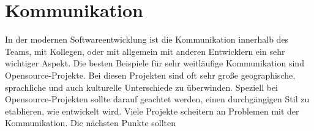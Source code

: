 \section{Kommunikation}
\SuperPar In der modernen Softwareentwicklung ist die Kommunikation innerhalb des Teams, mit Kollegen, oder mit allgemein mit anderen Entwicklern ein sehr wichtiger Aspekt. Die besten Beispiele für sehr weitläufige Kommunikation sind Opensource-Projekte. Bei diesen Projekten sind oft sehr große geographische, sprachliche und auch kulturelle Unterschiede zu überwinden. Speziell bei Opensource-Projekten sollte darauf geachtet werden, einen durchgängigen Stil zu etablieren, wie entwickelt wird. Viele Projekte scheitern an Problemen mit der Kommunikation. Die nächsten Punkte sollten   